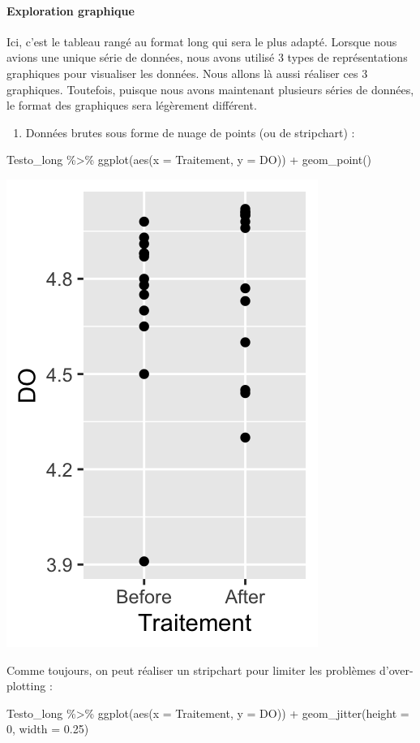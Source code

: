 \documentclass[
  a4paper,
]{article}
\newenvironment{Shaded}{\begin{snugshade}}{\end{snugshade}}
\newcommand{\AttributeTok}[1]{\textcolor[rgb]{0.00,0.34,0.68}{#1}}
\newcommand{\DecValTok}[1]{\textcolor[rgb]{0.69,0.50,0.00}{#1}}
\newcommand{\FloatTok}[1]{\textcolor[rgb]{0.69,0.50,0.00}{#1}}
\newcommand{\FunctionTok}[1]{\textcolor[rgb]{0.39,0.29,0.61}{#1}}
\newcommand{\NormalTok}[1]{\textcolor[rgb]{0.12,0.11,0.11}{#1}}
\newcommand{\SpecialCharTok}[1]{\textcolor[rgb]{0.24,0.68,0.91}{#1}}
\providecommand{\tightlist}{%
  \setlength{\itemsep}{0pt}\setlength{\parskip}{0pt}}
\begin{document}
\hypertarget{exploration-graphique-1}{%
\paragraph{Exploration graphique}\label{exploration-graphique-1}}

Ici, c'est le tableau rangé au format long qui sera le plus adapté. Lorsque nous avions une unique série de données, nous avons utilisé 3 types de représentations graphiques pour visualiser les données. Nous allons là aussi réaliser ces 3 graphiques. Toutefois, puisque nous avons maintenant plusieurs séries de données, le format des graphiques sera légèrement différent.

\begin{enumerate}
\def\labelenumi{\arabic{enumi}.}
\tightlist
\item
  Données brutes sous forme de nuage de points (ou de stripchart) :
\end{enumerate}

\begin{Shaded}
\begin{Highlighting}[]
\NormalTok{Testo\_long }\SpecialCharTok{\%\textgreater{}\%} 
  \FunctionTok{ggplot}\NormalTok{(}\FunctionTok{aes}\NormalTok{(}\AttributeTok{x =}\NormalTok{ Traitement, }\AttributeTok{y =}\NormalTok{ DO)) }\SpecialCharTok{+}
  \FunctionTok{geom\_point}\NormalTok{()}
\end{Highlighting}
\end{Shaded}

\begin{center}\includegraphics[width=0.25\linewidth]{figure/unnamed-chunk-31-1} \end{center}

Comme toujours, on peut réaliser un stripchart pour limiter les problèmes d'over-plotting :

\begin{Shaded}
\begin{Highlighting}[]
\NormalTok{Testo\_long }\SpecialCharTok{\%\textgreater{}\%} 
  \FunctionTok{ggplot}\NormalTok{(}\FunctionTok{aes}\NormalTok{(}\AttributeTok{x =}\NormalTok{ Traitement, }\AttributeTok{y =}\NormalTok{ DO)) }\SpecialCharTok{+}
  \FunctionTok{geom\_jitter}\NormalTok{(}\AttributeTok{height =} \DecValTok{0}\NormalTok{, }\AttributeTok{width =} \FloatTok{0.25}\NormalTok{)}
\end{Highlighting}
\end{Shaded}
\end{document}
